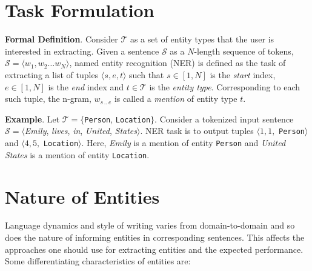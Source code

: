 \section{Task Formulation}
\label{sec:task_formulation}
\textbf{Formal Definition}. Consider $\mathcal{T}$ as a set of entity types that the user is interested in extracting. Given a sentence $\mathcal{S}$ as a $N$-length sequence of tokens, $\mathcal{S} = \langle w_1, w_2 \ldots w_N \rangle$, named entity recognition (NER) is defined as the task of extracting a list of tuples $\langle s, e, t \rangle$ such that $s \in [1, N]$ is the \textit{start} index, $e \in [1, N]$ is the \textit{end} index and $t \in \mathcal{T}$ is the \textit{entity type}. Corresponding to each such tuple, the n-gram, $w_{s\,..\,e}$ is called a \textit{mention} of entity type $t$.

\textbf{Example}. Let $\mathcal{T} = \{$\texttt{Person}, \texttt{Location}$\}$. Consider a tokenized input sentence $\mathcal{S} = \langle$\textit{Emily}, \textit{lives}, \textit{in}, \textit{United}, \textit{States}$\rangle$. NER task is to output tuples $\langle 1, 1,$ \texttt{Person}$\rangle$ and $\langle 4, 5,$ \texttt{Location}$\rangle$. Here, \textit{Emily} is a mention of entity \texttt{Person} and \textit{United States} is a mention of entity \texttt{Location}.

\section{Nature of Entities}
\label{sec:nature_of_entities}
Language dynamics and style of writing varies from domain-to-domain and so does the nature of informing entities in corresponding sentences. This affects the approaches one should use for extracting entities and the expected performance. Some differentiating characteristics of entities are:

